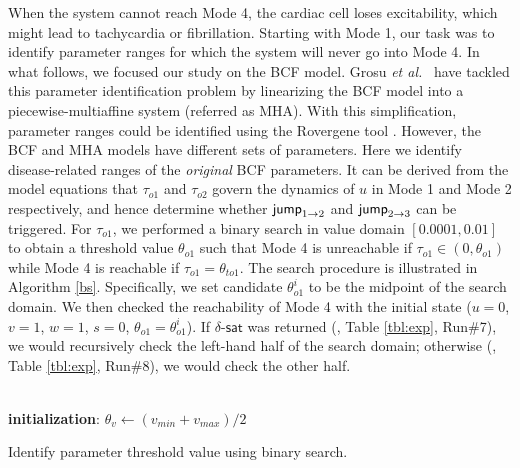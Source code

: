 When the system cannot reach Mode 4, the cardiac cell loses excitability, which might lead to tachycardia or fibrillation. Starting with Mode 1, our task was to identify parameter ranges for which the system will never go into Mode 4. In what follows, we focused our study on the BCF model.
Grosu {\em et al.}~\cite{grosu11} have tackled this parameter identification problem by linearizing the BCF model into a piecewise-multiaffine system (referred as MHA). With this simplification, parameter ranges could be identified using the Rovergene tool \cite{rovergene}. However, the BCF and MHA models have different sets of parameters. Here we identify disease-related ranges of the {\em original} BCF parameters. It can be derived from the model equations that $\tau_{o1}$ and $\tau_{o2}$ govern the dynamics of $u$ in Mode 1 and Mode 2 respectively, and hence determine whether $\mathsf{jump}_{1\rightarrow 2}$ and  $\mathsf{jump}_{2\rightarrow 3}$ can be triggered. For $\tau_{o1}$, we performed a binary search in value domain $[0.0001,0.01]$ to obtain a threshold value $\theta_{o1}$ such that Mode 4 is unreachable if $\tau_{o1} \in (0, \theta_{o1})$ while Mode 4 is reachable if $\tau_{o1} =  \theta_{to1}$. The search procedure is illustrated in Algorithm \ref{bs}. Specifically, we set candidate $\theta^i_{o1}$ to be the midpoint of the search domain. We then checked the reachability of Mode 4 with the initial state ($u = 0$, $v = 1$, $w = 1$, $s = 0$, $\theta_{o1} = \theta^i_{o1}$). If $\delta$-$\mathsf{sat}$ was returned (\eg, Table \ref{tbl:exp}, Run\#7), we would recursively check the left-hand half of the search domain; otherwise (\eg, Table \ref{tbl:exp}, Run\#8), we would check the other half.

\begin{algorithm}
\SetAlgoLined
{}
\\
\textbf{initialization}: $\theta_{v} \leftarrow (v_{min}+v_{max})/2$\;
\caption{Identify parameter threshold value using binary search. \label{bs}}
\end{algorithm}



